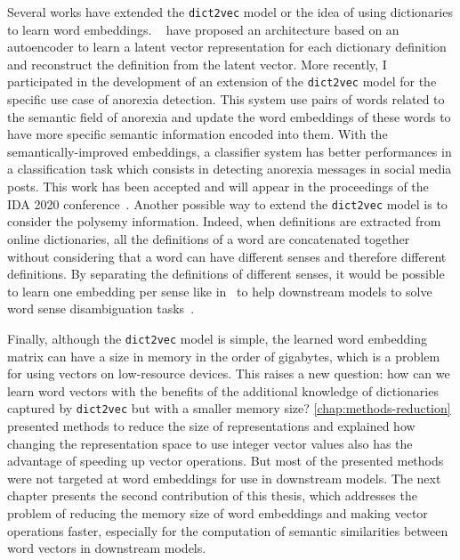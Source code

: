   Several works have extended the \texttt{dict2vec} model or the idea of using
  dictionaries to learn word embeddings.
  \citeauthor{bosc2018auto}~\citep{bosc2018auto} have proposed an architecture
  based on an autoencoder to learn a latent vector representation for each
  dictionary definition and reconstruct the definition from the latent vector.
  More recently, I participated in the development of an extension of the
  \texttt{dict2vec} model for the specific use case of anorexia detection. This
  system use pairs of words related to the semantic field of anorexia and update
  the word embeddings of these words to have more specific semantic information
  encoded into them. With the semantically-improved embeddings, a classifier
  system has better performances in a classification task which consists in
  detecting anorexia messages in social media posts. This work has been accepted
  and will appear in the proceedings of the IDA 2020
  conference~\citep{ramirez2020anorexia}. Another possible way to extend the
  \texttt{dict2vec} model is to consider the polysemy information. Indeed, when
  definitions are extracted from online dictionaries, all the definitions of a
  word are concatenated together without considering that a word can have
  different senses and therefore different definitions. By separating the
  definitions of different senses, it would be possible to learn one embedding
  per sense like in~\citep{iacobacci2015sensembed} to help downstream models to
  solve word sense disambiguation tasks~\citep{iacobacci2016embeddings}.
  \medskip

  Finally, although the \texttt{dict2vec} model is simple, the learned word
  embedding matrix can have a size in memory in the order of gigabytes, which is
  a problem for using vectors on low-resource devices. This raises a new
  question: how can we learn word vectors with the benefits of the additional
  knowledge of dictionaries captured by \texttt{dict2vec} but with a smaller
  memory size? \autoref{chap:methods-reduction} presented methods to reduce the
  size of representations and explained how changing the representation space to
  use integer vector values also has the advantage of speeding up vector
  operations. But most of the presented methods were not targeted at word
  embeddings for use in downstream models. The next chapter presents the second
  contribution of this thesis, which addresses the problem of reducing the memory
  size of word embeddings and making vector operations faster, especially for
  the computation of semantic similarities between word vectors in downstream
  models.
